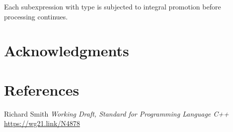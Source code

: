 \documentclass{wg21}
\begin{document}
Each subexpression with type
is subjected to integral promotion before processing continues.

\section{Acknowledgments}

\section{References}
\renewcommand{\section}[2]{}%



\begin{thebibliography}{9}

Richard Smith
\emph{Working Draft, Standard for Programming Language C++}\newline
\url{https://wg21.link/N4878}

\end{thebibliography}
\end{document}
